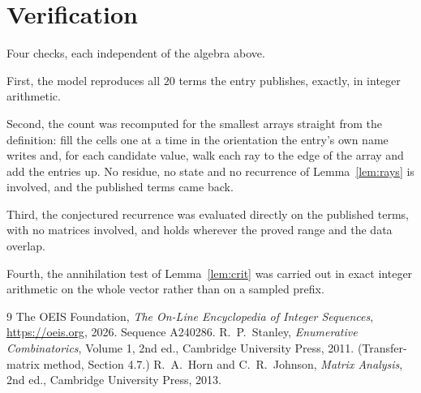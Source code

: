 \documentclass[11pt,a4paper]{article}
\theoremstyle{plain}
\theoremstyle{definition}
\begin{document}
\section{Verification}

Four checks, each independent of the algebra above.

First, the model reproduces all $20$ terms the entry publishes, exactly, in integer
arithmetic.

Second, the count was recomputed for the smallest arrays straight from the definition: fill the
cells one at a time in the orientation the entry's own name writes and, for each candidate
value, walk each ray to the edge of the array and add the entries up. No residue, no state and
no recurrence of Lemma~\ref{lem:rays} is involved, and the published terms came back.

Third, the conjectured recurrence was evaluated directly on the published terms, with no
matrices involved, and holds wherever the proved range and the data overlap.

Fourth, the annihilation test of Lemma~\ref{lem:crit} was carried out in exact integer
arithmetic on the whole vector rather than on a sampled prefix.

\begin{thebibliography}{9}
 The OEIS Foundation, \emph{The On-Line Encyclopedia of Integer
Sequences}, \url{https://oeis.org}, 2026. Sequence A240286.
 R.~P.~Stanley, \emph{Enumerative Combinatorics}, Volume 1, 2nd ed.,
Cambridge University Press, 2011. (Transfer-matrix method, Section 4.7.)
 R.~A.~Horn and C.~R.~Johnson, \emph{Matrix Analysis}, 2nd ed., Cambridge
University Press, 2013.
\end{thebibliography}
\end{document}
